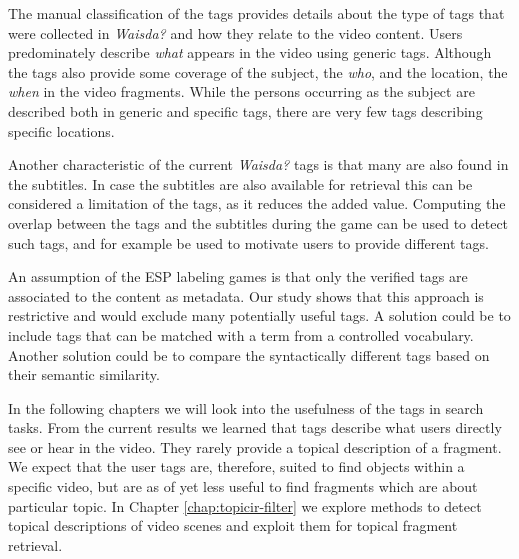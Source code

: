 The manual classification of the tags provides details about the type of tags
that were collected in \emph{Waisda?} and how they relate to the video
content. Users predominately describe \emph{what} appears in the video using
generic tags. Although the tags also provide some coverage of the subject, the
\emph{who}, and the location, the \emph{when} in the video fragments. While
the persons occurring as the subject are described both in generic and
specific tags, there are very few tags describing specific locations.

Another characteristic of the current \emph{Waisda?} tags is that many are
also found in the subtitles. In case the subtitles are also available for
retrieval this can be considered a limitation of the tags, as it reduces the
added value. Computing the overlap between the tags and the subtitles during
the game can be used to detect such tags, and for example be used to motivate
users to provide different tags.

An assumption of the ESP labeling games is that only the verified tags are associated
to the content as metadata. Our study shows that this approach is restrictive and would exclude
many potentially useful tags. A solution could be to include tags that can be
matched with a term from a controlled vocabulary. Another solution could be to
compare the syntactically different tags based on their semantic similarity.

In the following chapters we will look into the usefulness of the tags in
search tasks. From the current results we learned that tags describe what
users directly see or hear in the video. They rarely provide a topical description
of a fragment. We expect that the user tags are, therefore, suited to find
objects within a specific video, but are as of yet less useful to find
fragments which are about particular topic. In Chapter \ref{chap:topicir-filter} we explore methods to detect
topical descriptions of video scenes and exploit them for topical fragment retrieval.